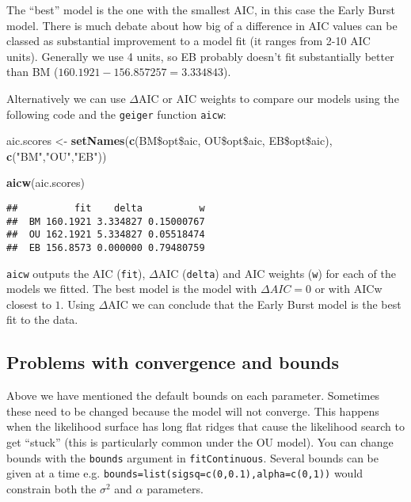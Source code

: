 \documentclass[11pt]{article}
\newcommand{\KeywordTok}[1]{\textcolor[rgb]{0.13,0.29,0.53}{\textbf{{#1}}}}
\newcommand{\CharTok}[1]{\textcolor[rgb]{0.31,0.60,0.02}{{#1}}}
\newcommand{\StringTok}[1]{\textcolor[rgb]{0.31,0.60,0.02}{{#1}}}
\newcommand{\NormalTok}[1]{{#1}}
\begin{document}
The ``best'' model is the one with the smallest AIC, in this case the Early Burst model. There is much debate about how big of a difference in AIC values can be classed as substantial improvement to a model fit (it ranges from 2-10 AIC units). Generally we use 4 units, so EB probably doesn't fit substantially better than BM ($160.1921 - 156.857257 = 3.334843$). 

Alternatively we can use $\Delta$AIC or AIC weights to compare our models using the following code and the \texttt{geiger} function \texttt{aicw}:

\begin{snugshade}
\begin{Highlighting}[]
\NormalTok{aic.scores <-}\StringTok{ }\KeywordTok{setNames}\NormalTok{(}\KeywordTok{c}\NormalTok{(BM\$opt\$aic, OU\$opt\$aic, EB\$opt\$aic),}
                       \KeywordTok{c}\NormalTok{(}\StringTok{"}\CharTok{BM}\StringTok{"}\NormalTok{,}\StringTok{"}\CharTok{OU}\StringTok{"}\NormalTok{,}\StringTok{"}\CharTok{EB}\StringTok{"}\NormalTok{))}

\KeywordTok{aicw}\NormalTok{(aic.scores)}
\end{Highlighting}
\end{snugshade}

\begin{verbatim}
##          fit    delta          w
##  BM 160.1921 3.334827 0.15000767
##  OU 162.1921 5.334827 0.05518474
##  EB 156.8573 0.000000 0.79480759
\end{verbatim}

\texttt{aicw} outputs the AIC (\texttt{fit}), $\Delta$AIC (\texttt{delta}) and AIC weights (\texttt{w}) for each of the models we fitted. The best model is the model with $\Delta AIC =0$ or with AICw closest to $1$. Using $\Delta$AIC we can conclude that the Early Burst model is the best fit to the data.

\subsection{Problems with convergence and bounds}
\label{bounds}

Above we have mentioned the default bounds on each parameter. Sometimes these need to be changed because the model will not converge. This happens when the likelihood surface has long flat ridges that cause the likelihood search to get ``stuck'' (this is particularly common under the OU model). You can change bounds with the \texttt{bounds} argument in \texttt{fitContinuous}. Several bounds can be given at a time e.g. \texttt{bounds=list(sigsq=c(0,0.1),alpha=c(0,1))} would constrain both the $\sigma^2$ and $\alpha$ parameters.
\end{document}
